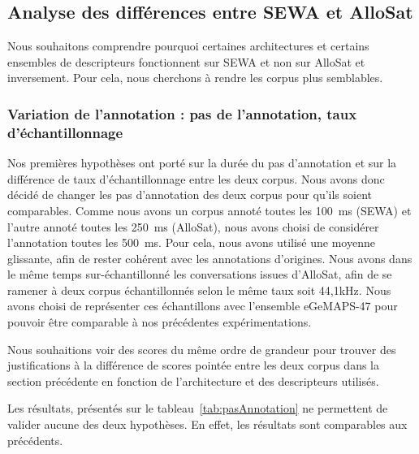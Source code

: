 \subsection{Analyse des différences entre SEWA et AlloSat}
Nous souhaitons comprendre pourquoi certaines architectures et certains ensembles de descripteurs fonctionnent sur SEWA et non sur AlloSat et inversement. Pour cela, nous cherchons à rendre les corpus plus semblables.

\subsubsection{Variation de l'annotation : pas de l'annotation, taux d'échantillonnage}
Nos premières hypothèses ont porté sur la durée du pas d'annotation et sur la différence de taux d'échantillonnage entre les deux corpus. Nous avons donc décidé de changer les pas d'annotation des deux corpus pour qu'ils soient comparables. Comme nous avons un corpus annoté toutes les 100~ms (SEWA) et l'autre annoté toutes les 250~ms (AlloSat), nous avons choisi de considérer l'annotation toutes les 500~ms. Pour cela, nous avons utilisé une moyenne glissante, afin de rester cohérent avec les annotations d'origines. Nous avons dans le même temps sur-échantillonné les conversations issues d'AlloSat, afin de se ramener à deux corpus échantillonnés selon le même taux soit 44,1kHz. Nous avons choisi de représenter ces échantillons avec l'ensemble eGeMAPS-47 pour pouvoir être comparable à nos précédentes expérimentations.

Nous souhaitions voir des scores du même ordre de grandeur pour trouver des justifications à la différence de scores pointée entre les deux corpus dans la section précédente en fonction de l'architecture et des descripteurs utilisés.



Les résultats, présentés sur le tableau~\ref{tab:pasAnnotation} ne permettent de valider aucune des deux hypothèses. En effet, les résultats sont comparables aux précédents.


